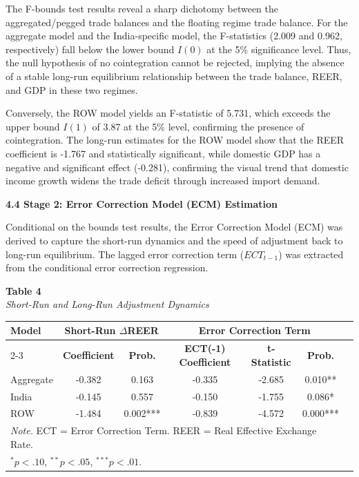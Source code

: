 \documentclass[12pt]{article}
\begin{document}
The F-bounds test results reveal a sharp dichotomy between the aggregated/pegged trade balances and the floating regime trade balance. For the aggregate model and the India-specific model, the F-statistics (2.009 and 0.962, respectively) fall below the lower bound 
$I(0)$ at the 5\% significance level. Thus, the null hypothesis of no cointegration cannot be rejected, implying the absence of a stable long-run equilibrium relationship between the trade balance, REER, and GDP in these two regimes.

Conversely, the ROW model yields an F-statistic of 5.731, which exceeds the upper bound 
$I(1)$ of 3.87 at the 5\% level, confirming the presence of cointegration. The long-run estimates for the ROW model show that the REER coefficient is -1.767 and statistically significant, while domestic GDP has a negative and significant effect (-0.281), confirming the visual trend that domestic income growth widens the trade deficit through increased import demand.

\vspace{0.5cm}
\noindent\textbf{4.4 Stage 2: Error Correction Model (ECM) Estimation}

Conditional on the bounds test results, the Error Correction Model (ECM) was derived to capture the short-run dynamics and the speed of adjustment back to long-run equilibrium. The lagged error correction term ($ECT_{t-1}$) was extracted from the conditional error correction regression.

\begin{table}[htbp]
\raggedright

\textbf{Table 4}\\
\textit{Short-Run and Long-Run Adjustment Dynamics}

\vspace{0.3cm}


\begin{tabular}{lcccccc}
\hline
\textbf{Model} & \multicolumn{2}{c}{\textbf{Short-Run }$\Delta$\textbf{REER}} & \multicolumn{3}{c}{\textbf{Error Correction Term}} \\
\cline{2-3} \cline{4-6}
 & \textbf{Coefficient} & \textbf{Prob.} & \textbf{ECT(-1) Coefficient} & \textbf{t-Statistic} & \textbf{Prob.} \\
\hline
Aggregate & -0.382 & 0.163 & -0.335 & -2.685 & 0.010** \\
India & -0.145 & 0.557 & -0.150 & -1.755 & 0.086* \\
ROW & -1.484 & 0.002*** & -0.839 & -4.572 & 0.000*** \\
\hline
\multicolumn{6}{l}{\textit{Note.} ECT = Error Correction Term. REER = Real Effective Exchange Rate.} \\
\multicolumn{6}{l}{$^{*}p < .10$, $^{**}p < .05$, $^{***}p < .01$.} \\
\hline
\end{tabular}
\end{table}
\end{document}
